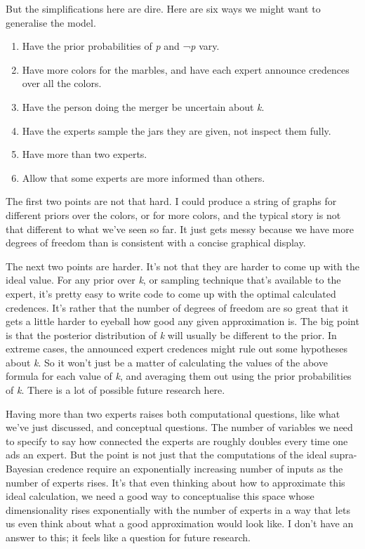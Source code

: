 \documentclass[
  10pt,
  letterpaper,
  DIV=11,
  numbers=noendperiod,
  twoside]{scrartcl}
\providecommand{\tightlist}{%
  \setlength{\itemsep}{0pt}\setlength{\parskip}{0pt}}\usepackage{longtable,booktabs,array}
\begin{document}
But the simplifications here are dire. Here are six ways we might want
to generalise the model.

\begin{enumerate}
\def\labelenumi{\arabic{enumi}.}
\tightlist
\item
  Have the prior probabilities of \emph{p} and ¬\emph{p} vary.
\item
  Have more colors for the marbles, and have each expert announce
  credences over all the colors.
\item
  Have the person doing the merger be uncertain about \emph{k}.
\item
  Have the experts sample the jars they are given, not inspect them
  fully.
\item
  Have more than two experts.
\item
  Allow that some experts are more informed than others.
\end{enumerate}

The first two points are not that hard. I could produce a string of
graphs for different priors over the colors, or for more colors, and the
typical story is not that different to what we've seen so far. It just
gets messy because we have more degrees of freedom than is consistent
with a concise graphical display.

The next two points are harder. It's not that they are harder to come up
with the ideal value. For any prior over \emph{k}, or sampling technique
that's available to the expert, it's pretty easy to write code to come
up with the optimal calculated credences. It's rather that the number of
degrees of freedom are so great that it gets a little harder to eyeball
how good any given approximation is. The big point is that the posterior
distribution of \emph{k} will usually be different to the prior. In
extreme cases, the announced expert credences might rule out some
hypotheses about \emph{k}. So it won't just be a matter of calculating
the values of the above formula for each value of \emph{k}, and
averaging them out using the prior probabilities of \emph{k}. There is a
lot of possible future research here.

Having more than two experts raises both computational questions, like
what we've just discussed, and conceptual questions. The number of
variables we need to specify to say how connected the experts are
roughly doubles every time one ads an expert. But the point is not just
that the computations of the ideal supra-Bayesian credence require an
exponentially increasing number of inputs as the number of experts
rises. It's that even thinking about how to approximate this ideal
calculation, we need a good way to conceptualise this space whose
dimensionality rises exponentially with the number of experts in a way
that lets us even think about what a good approximation would look like.
I don't have an answer to this; it feels like a question for future
research.
\end{document}
